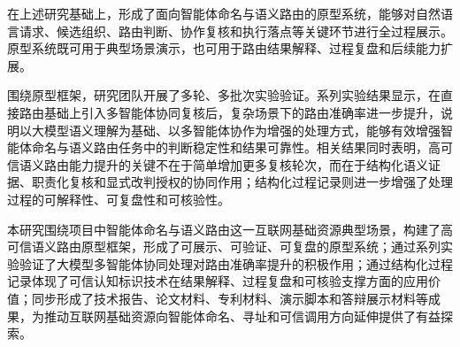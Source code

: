 \documentclass[11pt,a4paper]{ctexart}
\begin{document}
在上述研究基础上，形成了面向智能体命名与语义路由的原型系统，能够对自然语言请求、候选组织、路由判断、协作复核和执行落点等关键环节进行全过程展示。原型系统既可用于典型场景演示，也可用于路由结果解释、过程复盘和后续能力扩展。

围绕原型框架，研究团队开展了多轮、多批次实验验证。系列实验结果显示，在直接路由基础上引入多智能体协同复核后，复杂场景下的路由准确率进一步提升，说明以大模型语义理解为基础、以多智能体协作为增强的处理方式，能够有效增强智能体命名与语义路由任务中的判断稳定性和结果可靠性。相关结果同时表明，高可信语义路由能力提升的关键不在于简单增加更多复核轮次，而在于结构化语义证据、职责化复核和显式改判授权的协同作用；结构化过程记录则进一步增强了处理过程的可解释性、可复盘性和可核验性。

本研究围绕项目中智能体命名与语义路由这一互联网基础资源典型场景，构建了高可信语义路由原型框架，形成了可展示、可验证、可复盘的原型系统；通过系列实验验证了大模型多智能体协同处理对路由准确率提升的积极作用；通过结构化过程记录体现了可信认知标识技术在结果解释、过程复盘和可核验支撑方面的应用价值；同步形成了技术报告、论文材料、专利材料、演示脚本和答辩展示材料等成果，为推动互联网基础资源向智能体命名、寻址和可信调用方向延伸提供了有益探索。
\end{document}
